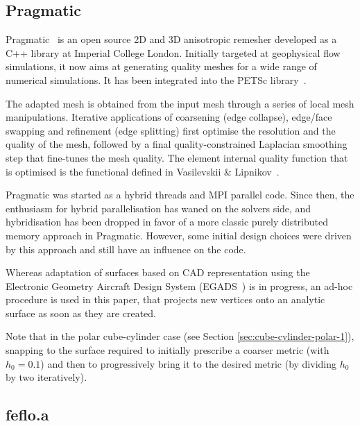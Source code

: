 \documentclass[3p,times,procedia,number]{elsarticle}
\begin{document}
\subsection{Pragmatic}

Pragmatic~\cite{pragmatic-website,Gorman-2015} is an open source 2D and
3D anisotropic remesher developed as a C++ library at Imperial College
London.  Initially targeted at geophysical flow simulations, it now
aims at generating quality meshes for a wide range of numerical
simulations. It has been integrated into the PETSc library~\cite{petsc-user-ref,Barral-2016}.

The adapted mesh is obtained from the input mesh through a series of
local mesh manipulations. Iterative applications of coarsening (edge collapse),
edge/face swapping and refinement (edge splitting) first optimise the
resolution and the quality of the mesh, followed by a final
quality-constrained Laplacian smoothing step that fine-tunes the mesh
quality. The element internal quality function that is optimised is
the functional defined in Vasilevskii \& Lipnikov~\cite{Vasilevskii-1999}.

Pragmatic was started as a hybrid threads and MPI parallel code. Since
then, the enthusiasm for hybrid parallelisation has waned on the solvers side,
and hybridisation has been dropped in favor of a more classic purely 
distributed memory approach in Pragmatic. However, some initial design 
choices were driven by this approach and still have an influence on the code. 

Whereas adaptation of surfaces based on CAD representation using the
Electronic Geometry Aircraft Design System (EGADS~\cite{haimes-drela-egads})
is in progress, an ad-hoc procedure is used in this paper, that projects 
new vertices onto an analytic surface as soon as they are created.

Note that in the polar cube-cylinder case (see Section \ref{sec:cube-cylinder-polar-1}), snapping 
to the surface required to initially prescribe a coarser metric (with $h_0 =0.1 $)
and then to progressively bring it to the desired metric (by dividing 
$h_0$ by two iteratively).


\subsection{feflo.a}
\end{document}
